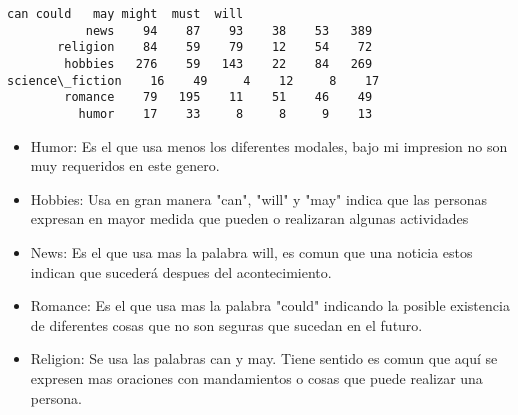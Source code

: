 \documentclass[11pt]{article}
\providecommand{\tightlist}{%
      \setlength{\itemsep}{0pt}\setlength{\parskip}{0pt}}
\begin{document}
    \begin{Verbatim}[commandchars=\\\{\}]
                  can could   may might  must  will 
           news    94    87    93    38    53   389 
       religion    84    59    79    12    54    72 
        hobbies   276    59   143    22    84   269 
science\_fiction    16    49     4    12     8    17 
        romance    79   195    11    51    46    49 
          humor    17    33     8     8     9    13 

    \end{Verbatim}

    \begin{itemize}
\tightlist
\item
  Humor: Es el que usa menos los diferentes modales, bajo mi impresion
  no son muy requeridos en este genero.
\item
  Hobbies: Usa en gran manera "can", "will" y "may" indica que las
  personas expresan en mayor medida que pueden o realizaran algunas
  actividades
\item
  News: Es el que usa mas la palabra will, es comun que una noticia
  estos indican que sucederá despues del acontecimiento.
\item
  Romance: Es el que usa mas la palabra "could" indicando la posible
  existencia de diferentes cosas que no son seguras que sucedan en el
  futuro.
\item
  Religion: Se usa las palabras can y may. Tiene sentido es comun que
  aquí se expresen mas oraciones con mandamientos o cosas que puede
  realizar una persona.
\end{itemize}
\end{document}

